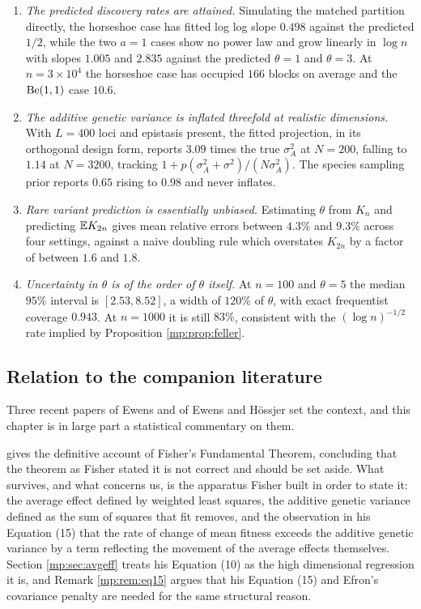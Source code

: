 \begin{enumerate}[leftmargin=1.8em,itemsep=3pt]
\item \emph{The predicted discovery rates are attained.} Simulating the matched partition
directly, the horseshoe case has fitted log log slope $0.498$ against the predicted $1/2$,
while the two $a=1$ cases show no power law and grow linearly in $\log n$ with slopes
$1.005$ and $2.835$ against the predicted $\theta=1$ and $\theta=3$. At $n=3\times10^4$ the
horseshoe case has occupied $166$ blocks on average and the $\mathrm{Be}(1,1)$ case $10.6$.
\item \emph{The additive genetic variance is inflated threefold at realistic dimensions.}
With $L=400$ loci and epistasis present, the fitted projection, in its orthogonal design form, reports $3.09$ times the
true $\sigma_A^2$ at $N=200$, falling to $1.14$ at $N=3200$, tracking $1+p(\sigma_A^2+\sigma^2)/(N\sigma_A^2)$. The
species sampling prior reports $0.65$ rising to $0.98$ and never inflates.
\item \emph{Rare variant prediction is essentially unbiased.} Estimating $\theta$ from
$K_n$ and predicting $\mathbb{E} K_{2n}$ gives mean relative errors between $4.3\%$ and $9.3\%$
across four settings, against a naive doubling rule which overstates $K_{2n}$ by a factor of
between $1.6$ and $1.8$.
\item \emph{Uncertainty in $\theta$ is of the order of $\theta$ itself.} At $n=100$ and
$\theta=5$ the median $95\%$ interval is $[2.53,8.52]$, a width of $120\%$ of $\theta$, with
exact frequentist coverage $0.943$. At $n=1000$ it is still $83\%$, consistent with the $(\log n)^{-1/2}$ rate
implied by Proposition \ref{mp:prop:feller}.
\end{enumerate}

\subsection{Relation to the companion literature}

Three recent papers of Ewens and of Ewens and H\"ossjer set the context, and this chapter is in
large part a statistical commentary on them.

\citet{mp:ewens2024} gives the definitive account of Fisher's Fundamental Theorem, concluding that
the theorem as Fisher stated it is not correct and should be set aside. What survives, and
what concerns us, is the apparatus Fisher built in order to state it: the average effect
defined by weighted least squares, the additive genetic variance defined as the sum of squares
that fit removes, and the observation in his Equation (15) that the rate of change of mean
fitness exceeds the additive genetic variance by a term reflecting the movement of the average
effects themselves. Section \ref{mp:sec:avgeff} treats his Equation (10) as the high dimensional
regression it is, and Remark \ref{mp:rem:eq15} argues that his Equation (15) and Efron's
covariance penalty are needed for the same structural reason.


